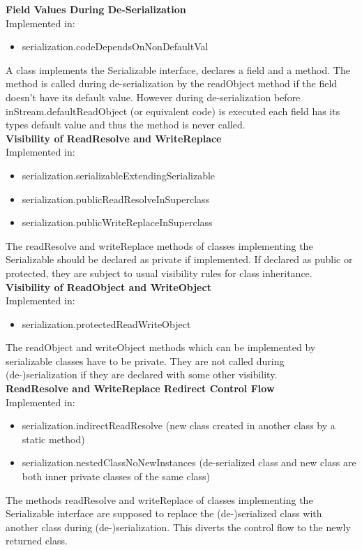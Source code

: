 \documentclass{article}
\begin{document}
\noindent
\textbf{Field Values During De-Serialization}\\
Implemented in: 
\begin{itemize}
    \item serialization.codeDependsOnNonDefaultVal
\end{itemize}
A class implements the Serializable interface, declares a field and a method. The method is called during de-serialization by the readObject method if the field doesn't have its default value. However during de-serialization before inStream.defaultReadObject (or equivalent code) is executed each field has its types default value and thus the method is never called.\\

\noindent
\textbf{Visibility of ReadResolve and WriteReplace}\\
Implemented in: 
\begin{itemize}
    \item serialization.serializableExtendingSerializable
    \item serialization.publicReadResolveInSuperclass
    \item serialization.publicWriteReplaceInSuperclass
\end{itemize}
The readResolve and writeReplace methods of classes implementing the Serializable should be declared as private if implemented. If declared as public or protected, they are subject to usual visibility rules for class inheritance.\\

\noindent
\textbf{Visibility of ReadObject and WriteObject}\\
Implemented in: 
\begin{itemize}
    \item serialization.protectedReadWriteObject
\end{itemize}
The readObject and writeObject methods which can be implemented by serializable classes have to be private. They are not called during (de-)serialization if they are declared with some other visibility.\\

\noindent
\textbf{ReadResolve and WriteReplace Redirect Control Flow}\\
Implemented in: 
\begin{itemize}
    \item serialization.indirectReadResolve (new class created in another class by a static method)
    \item serialization.nestedClassNoNewInstances (de-serialized class and new class are both inner private classes of the same class)
\end{itemize}
The methods readResolve and writeReplace of classes implementing the Serializable interface are supposed to replace the (de-)serialized class with another class during (de-)serialization. This diverts the control flow to the newly returned class.\\
\end{document}
